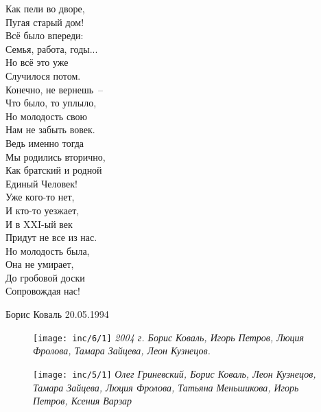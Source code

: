\begin{multicols}{2}
    Как пели во дворе,\\
    Пугая старый дом!\\
    \vfill
    \noindent
    Всё было впереди:\\
    Семья, работа, годы...\\
    Но всё это уже\\
    Случилося потом.\\
    \vfill
    \noindent
    Конечно, не вернешь~--\\
    Что было, то уплыло,\\
    Но молодость свою\\
    Нам не забыть вовек.\\
    \vfill
    \noindent
    Ведь именно тогда\\
    Мы родились вторично,\\
    Как братский и родной\\
    Единый Человек!\\
    \vfill
    \noindent
    Уже кого-то нет,\\
    И кто-то уезжает,\\
    И в XXI-ый век\\
    Придут не все из нас.\\
    \vfill
    \noindent
    Но молодость была,\\
    Она не умирает,\\
    До гробовой доски\\
    Сопровождая нас!\\
\end{multicols}
\vspace*{-5mm}

{\raggedleft Борис Коваль 20.05.1994 

}

\newpage

\begin{figure}[h!]
    \begin{minipage}{80mm}
    \texttt{[image: inc/6/1]}
    \textit{\footnotesize{2004 г. Борис Коваль, Игорь Петров, Люция Фролова, Тамара Зайцева, Леон Кузнецов.}}
    \end{minipage}
\end{figure}

\begin{figure}[h!]
    \begin{minipage}{80mm}
    \texttt{[image: inc/5/1]}
    \textit{\footnotesize{Олег Гриневский, Борис Коваль, Леон Кузнецов, Тамара Зайцева, Люция Фролова, Татьяна Меньшикова, Игорь Петров, Ксения Варзар}}
    \end{minipage}
\end{figure}

